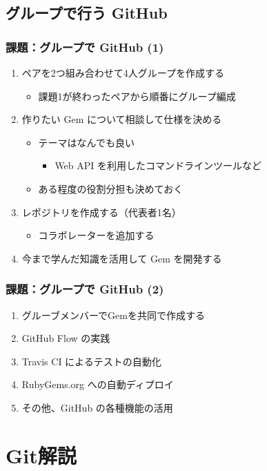 \documentclass[a4paper,twoside,twocolumn]{bxjsarticle}
\begin{document}
\subsection{グループで行う GitHub}
\label{sec-3-2}
\subsubsection{課題：グループで GitHub (1)}
\label{sec-3-2-1}
\begin{enumerate}
\item ペアを2つ組み合わせて4人グループを作成する
\begin{itemize}
\item 課題1が終わったペアから順番にグループ編成
\end{itemize}
\item 作りたい Gem について相談して仕様を決める
\begin{itemize}
\item テーマはなんでも良い
\begin{itemize}
\item Web API を利用したコマンドラインツールなど
\end{itemize}
\item ある程度の役割分担も決めておく
\end{itemize}
\item レポジトリを作成する（代表者1名）
\begin{itemize}
\item コラボレーターを追加する
\end{itemize}
\item 今まで学んだ知識を活用して Gem を開発する
\end{enumerate}
\subsubsection{課題：グループで GitHub (2)}
\label{sec-3-2-2}
\begin{enumerate}
\item グルーブメンバーでGemを共同で作成する
\item GitHub Flow の実践
\item Travis CI によるテストの自動化
\item RubyGems.org への自動ディプロイ
\item その他、GitHub の各種機能の活用
\end{enumerate}

\section{Git解説}
\label{sec-4}
\end{document}
